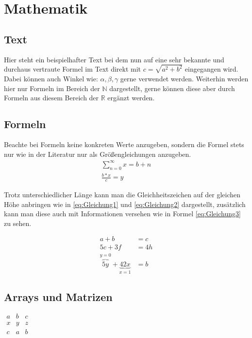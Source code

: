 \chapter{Mathematik}

\section{Text}
Hier steht ein beispielhafter Text bei dem nun auf eine sehr bekannte und durchaus vertraute Formel im Text direkt mit $c = \sqrt{a^2 + b^2}$ eingegangen wird. Dabei können auch Winkel wie: $\alpha, \beta, \gamma$ gerne verwendet werden. Weiterhin werden hier nur Formeln im Bereich der $\mathbb{N}$ dargestellt, gerne können diese aber durch Formeln aus diesem Bereich der $\mathbb{R}$ ergänzt werden.

\section{Formeln}
Beachte bei Formeln keine konkreten Werte anzugeben, sondern die Formel stets nur wie in der Literatur nur als Größengleichungen anzugeben.
\begin{align}
	\sum_{n=0}^{\infty}x=b+n\\
	\frac{b*x}{c} = y
\end{align}

Trotz unterschiedlicher Länge kann man die Gleichheitszeichen auf der gleichen Höhe anbringen wie in \autoref{eq:Gleichung1} und \autoref{eq:Gleichung2} dargestellt, zusätzlich kann man diese auch mit Informationen versehen wie in Formel \autoref{eq:Gleichung3} zu sehen.

\begin{align}
	\label{eq:Gleichung1} a + b &= c\\
	\label{eq:Gleichung2} 5c + 3f &= 4h\\ 
	\label{eq:Gleichung3} \overbrace{5y}^{y = 0} + \underbrace{42x}_{x = 1} &= b
\end{align}

\section{Arrays und Matrizen}

\begin{center}
	\(
	\begin{array}{lc|r}
		a&b&c\\
		\hline
		x&y&z\\
		c&a&b
	\end{array}
	\)
\end{center}

